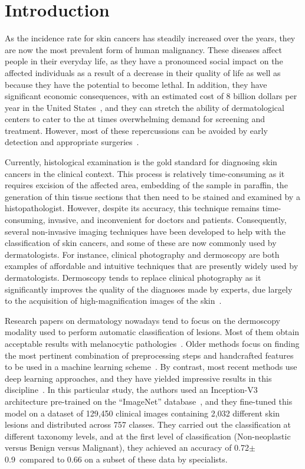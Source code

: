 \documentclass[journal,article,submit,moreauthors,pdftex, applsci]{Definitions/mdpi}
\begin{document}

\section{Introduction}
As the incidence rate for skin cancers has steadily increased over the years, they are now the most prevalent form of human malignancy. These diseases affect people in their everyday life, as they have a pronounced social impact on the affected individuals as a result of a decrease in their quality of life as well as because they have the potential to become lethal. In addition, they have significant economic consequences, with an estimated cost of 8 billion dollars per year in the United States~\cite{Farberg2017a}, and they can stretch the ability of dermatological centers to cater to the at times overwhelming demand for screening and treatment. However, most of these repercussions can be avoided by early detection and appropriate surgeries~\cite{Farberg2017a}.\par
Currently, histological examination is the gold standard for diagnosing skin cancers in the clinical context. This process is relatively time-consuming as it requires excision of the affected area, embedding of the sample in paraffin, the generation of thin tissue sections that then need to be stained and examined by a histopathologist. However, despite its accuracy, this technique remains time-consuming, invasive, and inconvenient for doctors and patients. Consequently, several non-invasive imaging techniques have been developed to help with the classification of skin cancers, and some of these are now commonly used by dermatologists. For instance, clinical photography and dermoscopy are both examples of affordable and intuitive techniques that are presently widely used by dermatologists. Dermoscopy tends to replace clinical photography as it significantly improves the quality of the diagnoses made by experts, due largely to the acquisition of high-magnification images of the skin~\cite{Sinz2017}.\par
Research papers on dermatology nowadays tend to focus on the dermoscopy modality used to perform automatic classification of lesions. Most of them obtain acceptable results with melanocytic pathologies~\cite{Iyatomi2010}. Older methods focus on finding the most pertinent combination of preprocessing steps and handcrafted features to be used in a machine learning scheme~\cite{Rastgoo2015,Pathan2018}. By contrast, most recent methods use deep learning approaches, and they have yielded impressive results in this discipline~\cite{Esteva2017}. In this particular study, the authors used an Inception-V3 architecture pre-trained on the “ImageNet” database~\cite{Deng2008}, and they fine-tuned this model on a dataset of 129,450 clinical images containing 2,032 different skin lesions and distributed across 757 classes. They carried out the classification at different taxonomy levels, and at the first level of classification (Non-neoplastic versus Benign versus Malignant), they achieved an accuracy of 0.72$\pm$0.9\ compared to 0.66 on a subset of these data by specialists.\par
\end{document}
